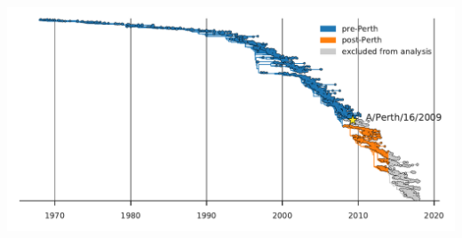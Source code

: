 \documentclass[9pt,twocolumn,twoside]{pnas-new}
\begin{document}
\begin{suppfigure}[H]
\centerline{\includegraphics[width=1.0\textwidth]{figs/S04_post_Perth2009/post_Perth2009_seqpref.pdf}}
\caption{\label{suppfig:tree}
{\bf A phylogenetic tree of all HA sequences used in our analysis of mutation frequencies.}
HA sequences were sampled at a rate of six viruses per month from January 1, 1968 through February 1, 2018.
The Perth/2009 strain used in our experiments is indicated.
The rest of the tree is partitioned into nodes that preceded the split of the Perth/2009 strain from the trunk of the tree (blue) and nodes that branched off the trunk after the clade containing Perth/2009 (orange).
In Figure~\ref{fig:muteffect_maxfreq}, these two partitions of the tree are analyzed separately.
Nodes in the clade containing the Perth/2009 strain and nodes sampled in 2014 or after were excluded from our analyses.
}
\end{suppfigure}
\end{document}
